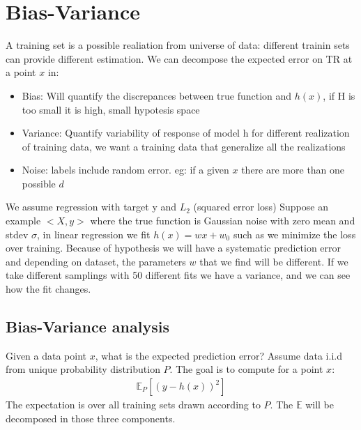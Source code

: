 \documentclass[12pt]{book}
\begin{document}
\section{Bias-Variance}
A training set is a possible realiation from universe of data: different trainin sets can provide different estimation.\newline
We can decompose the expected error on TR at a point $x$ in:
\begin{itemize}
	\item Bias: Will quantify the discrepances between true function and $h(x)$, if H is too small it is high, small hypotesis space
	\item Variance: Quantify variability of response of model h for different realization of training data, we want a training data that generalize all the realizations
	\item Noise: labels include random error. eg: if a given $x$ there are more than one possible $d$ 
\end{itemize}
We assume regression with target y and $L_2$ (squared error loss)\newline
Suppose an example $<X,y>$ where the true function is Gaussian noise with zero mean and stdev $\sigma$, in linear regression we fit $h(x)=wx+w_0$ such as we minimize the loss over training.\newline
Because of hypothesis we will have a systematic prediction error and depending on dataset, the parameters $w$ that we find will be different.\newline
If we take different samplings with 50 different fits we have a variance, and we can see how the fit changes.

\subsection{Bias-Variance analysis}
Given a data point $x$, what is the expected prediction error?\newline
Assume data i.i.d from unique probability distribution $P$.\newline
The goal is to compute for a point $x$:
\begin{equation}
	\begin{align}
		\mathbb{E}_P[(y-h(x))^2]
	\end{align}
\end{equation}
The expectation is over all training sets drawn according to $P$. The $\mathbb{E}$ will be decomposed in those three components.
\end{document}
